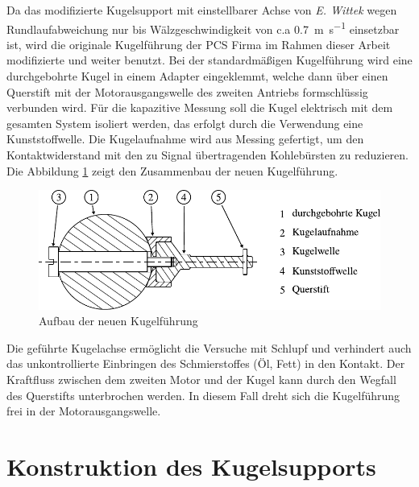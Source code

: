 Da das modifizierte Kugelsupport mit einstellbarer Achse von \textit{E. Wittek} \cite{wittek_2007} wegen Rundlaufabweichung nur bis Wälzgeschwindigkeit von c.a \SI[per-mode=symbol]{0.7}{\meter\per\second} einsetzbar ist, wird die originale Kugelführung der PCS Firma im Rahmen dieser Arbeit modifizierte und weiter benutzt.
Bei der standardmäßigen Kugelführung wird eine durchgebohrte Kugel in einem Adapter eingeklemmt, welche dann über einen Querstift mit der Motorausgangswelle des zweiten Antriebs formschlüssig verbunden wird.
Für die kapazitive Messung soll die Kugel elektrisch mit dem gesamten System isoliert werden, das erfolgt durch die Verwendung eine Kunststoffwelle.
Die Kugelaufnahme wird aus Messing gefertigt, um den Kontaktwiderstand mit den zu Signal übertragenden Kohlebürsten zu reduzieren.
Die Abbildung \ref{fig:aufbau_der_neuen_kugelfuehrung} zeigt den Zusammenbau der neuen Kugelführung.
\begin{figure}[htb]
    \centering
    \includegraphics[]{./images/durchgebohrte_kugel.pdf}
    \caption{Aufbau der neuen Kugelführung}
    \label{fig:aufbau_der_neuen_kugelfuehrung}
\end{figure}
%

Die geführte Kugelachse ermöglicht die Versuche mit Schlupf und verhindert auch das unkontrollierte Einbringen des Schmierstoffes (Öl, Fett) in den Kontakt.
Der Kraftfluss zwischen dem zweiten Motor und der Kugel kann durch den Wegfall des Querstifts unterbrochen werden.
In diesem Fall dreht sich die Kugelführung frei in der Motorausgangswelle.

\section{Konstruktion des Kugelsupports}
\label{sec:konstruktion_des_kugelsupports}

